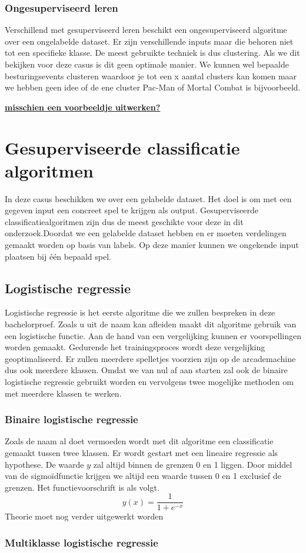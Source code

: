 \subsubsection*{Ongesuperviseerd leren}
\label{sec: ongesuperviseerd-leren}
Verschillend met gesuperviseerd leren beschikt een ongesuperviseerd algoritme over een ongelabelde dataset. Er zijn verschillende inputs maar die behoren niet tot een specifieke klasse. De meest gebruikte techniek is dus clustering. Als we dit bekijken voor deze casus is dit geen optimale manier. We kunnen wel bepaalde besturingsevents clusteren waardoor je tot een x aantal clusters kan komen maar we hebben geen idee of de ene cluster Pac-Man of Mortal Combat is bijvoorbeeld. 


\textbf{\underline{{\Large misschien een voorbeeldje uitwerken? }}}

\section{Gesuperviseerde classificatie algoritmen}
\label{sec:gesuperviseerde-classificatie-algoritmen}

In deze casus beschikken we over een gelabelde dataset. Het doel is om met een gegeven input een concreet spel te krijgen als output. Gesuperviseerde classificatiealgoritmen zijn dus de meest geschikte voor deze in dit onderzoek.Doordat we een gelabelde dataset hebben en er moeten verdelingen gemaakt worden op basis van labels. Op deze manier kunnen we ongekende input plaatsen bij één bepaald spel.

\subsection{Logistische regressie}
\label{sec:logistische-regressie}

Logistische regressie is het eerste algoritme die we zullen bespreken in deze bachelorproef. Zoals u uit de naam kan afleiden maakt dit algoritme gebruik van een logistische functie. Aan de hand van een vergelijking kunnen er voorspellingen worden gemaakt. Gedurende het trainingsproces wordt deze vergelijking geoptimaliseerd. Er zullen meerdere spelletjes voorzien zijn op de arcademachine dus ook meerdere klassen. Omdat we van nul af aan starten zal ook de binaire logistische regressie gebruikt worden en vervolgens twee mogelijke methoden om met meerdere klassen te werken. 

\subsubsection{Binaire logistische regressie}
\label{sec:Binaire-logistische-regressie}
Zoals de naam al doet vermoeden wordt met dit algoritme een classificatie gemaakt tussen twee klassen. 
Er wordt gestart met een lineaire regressie als hypothese. De waarde $y$ zal altijd binnen de grenzen 0 en 1 liggen.  Door middel van de sigmoïdfunctie krijgen we altijd een waarde tussen 0 en 1 exclusief de grenzen. Het functievoorschrift is als volgt. 
$$
y(x) = {\frac{1}{1+e^{-x}}}
$$
Theorie moet nog verder uitgewerkt worden

\subsubsection{Multiklasse logistische regressie}
\label{sec:Multiklasse-logistische-regressie}




